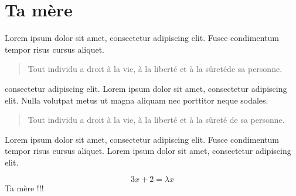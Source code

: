 \documentclass[11pt]{book}
\begin{document}
\chapter{Ta mère}
Lorem ipsum dolor sit amet, consectetur adipiscing elit. 
Fusce condimentum tempor risus cursus aliquet.
\begin{quote}
Tout individu a droit à la vie, à la liberté et à la sûretéde sa personne. \end{quote}
consectetur adipiscing elit. 
Lorem ipsum dolor sit amet, consectetur adipiscing elit.
Nulla volutpat metus ut magna aliquam nec porttitor neque sodales. 
\begin{quotation}
Tout individu a droit à la vie, à la liberté et à la sûreté de sa personne.  \end{quotation}
Lorem ipsum dolor sit amet, consectetur adipiscing elit. 
Fusce condimentum tempor risus cursus aliquet.
Lorem ipsum dolor sit amet, consectetur adipiscing elit.

$$3x+2=\lambda x$$
\textcolor{chiasse}{Ta mère !!!}
 
\end{document}
